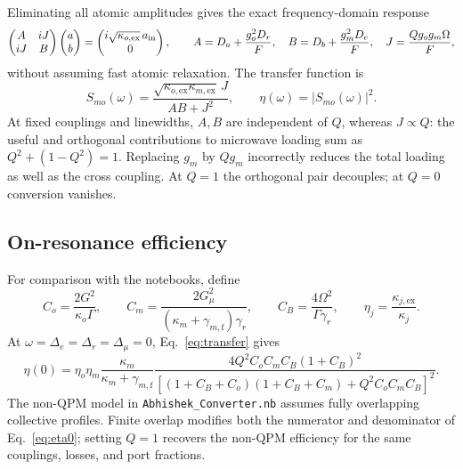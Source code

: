 \documentclass[aps,pra,onecolumn,10pt,letterpaper,notitlepage,nofootinbib,amsmath,amssymb]{revtex4-2}
\newcommand{\Om}{\Omega}
\newcommand{\gadd}{\gamma_{m,\mathrm{f}}}
\begin{document}
Eliminating all atomic amplitudes gives the exact frequency-domain response
\begin{equation}
 \begin{pmatrix}A&iJ\\iJ&B\end{pmatrix}
 \begin{pmatrix}a\\b\end{pmatrix}
 =\begin{pmatrix}i\sqrt{\kappa_{o,\mathrm{ex}}}\,a_{\rm in}\\0\end{pmatrix},
 \qquad
 A=D_a+\frac{g_o^2D_r}{F},\quad
 B=D_b+\frac{g_m^2D_e}{F},\quad J=\frac{Qg_og_m\Om}{F},
 \label{eq:effective-cavities}
\end{equation}
without assuming fast atomic relaxation. The transfer function is
\begin{equation}
 \boxed{S_{mo}(\omega)=
 \frac{\sqrt{\kappa_{o,\mathrm{ex}}\kappa_{m,\mathrm{ex}}}\,J}{AB+J^2},
 \qquad \eta(\omega)=|S_{mo}(\omega)|^2.}
 \label{eq:transfer}
\end{equation}
At fixed couplings and linewidths, $A,B$ are independent of $Q$, whereas $J\propto Q$:
the useful and orthogonal contributions to microwave loading sum as $Q^2+(1-Q^2)=1$.
Replacing $g_m$ by $Qg_m$ incorrectly reduces the total loading as well as the
cross coupling. At $Q=1$ the orthogonal pair decouples; at $Q=0$ conversion vanishes.

\subsection{On-resonance efficiency}
For comparison with the notebooks, define
\begin{equation}
 C_o=\frac{2G^2}{\kappa_o\Gamma},\qquad
 C_m=\frac{2G_\mu^2}{(\kappa_m+\gadd)\gamma_r},\qquad
 C_B=\frac{4\Om^2}{\Gamma\gamma_r},\qquad
 \eta_j=\frac{\kappa_{j,\mathrm{ex}}}{\kappa_j}.
 \label{eq:coops}
\end{equation}
At $\omega=\Delta_e=\Delta_r=\Delta_\mu=0$, Eq.~\eqref{eq:transfer} gives
\begin{equation}
 \eta(0)=\eta_o\eta_m\frac{\kappa_m}{\kappa_m+\gadd}
 \frac{4Q^2C_oC_mC_B(1+C_B)^2}
 {[(1+C_B+C_o)(1+C_B+C_m)+Q^2C_oC_mC_B]^2}.
 \label{eq:eta0}
\end{equation}
The non-QPM model in \texttt{Abhishek\_Converter.nb} assumes fully overlapping
collective profiles. Finite overlap modifies both the numerator and denominator
of Eq.~\eqref{eq:eta0}; setting $Q=1$ recovers the non-QPM efficiency for the same
couplings, losses, and port fractions.
\end{document}
